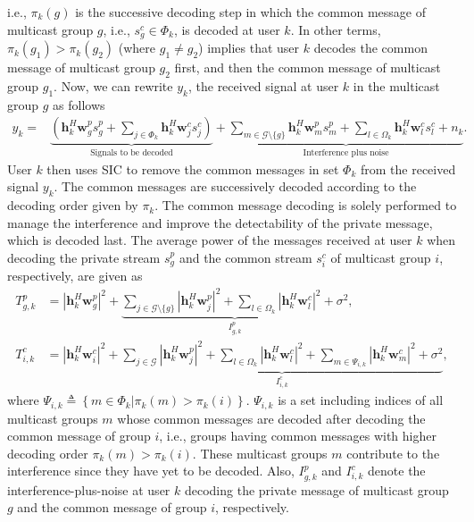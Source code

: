 \documentclass[12pt,draftcls,onecolumn]{IEEEtran}
\theoremstyle{remark}
\theoremstyle{definition}
\begin{document}
i.e., $\pi_{k}(g)$ is the successive decoding step in which the common message of multicast group $g$, i.e., $s_g^c \in \Phi_k$, is decoded at user $k$. {In other terms, $\pi_{k}(g_1) > \pi_{k}(g_2)$ (where $g_1 \neq g_2$) implies that user $k$ decodes the common message of multicast group $g_2$ first, and then the common message of multicast group $g_1$.
	Now, we can rewrite ${y}_k$, the received signal at user $k$ in the multicast group $g$ as follows
	\begin{align}\label{eq:e2.15}
	y_k = & \underbrace{\left(\mathbf{h}_{k}^H\mathbf{w}_{g}^p {s}_{g}^p + \sum_{j \in \Phi_{k}}\mathbf{h}_{k}^H\mathbf{w}_{j}^c {s}_{j}^c\right)}_{\text{Signals to be decoded}} + \underbrace{\sum_{m \in \mathcal{G}\setminus \{g\}}\mathbf{h}_{k}^H\mathbf{w}_{m}^p {s}_{m}^p + \sum_{l \in \Omega_{k}}\mathbf{h}_{k}^H\mathbf{w}_{l}^c {s}_{l}^c+ n_k}_\text{Interference plus noise}.
	\end{align}
	User $k$ then uses SIC to remove the common messages in set $\Phi_{k}$ from the received signal $y_k$. The common messages are successively decoded according to the decoding order given by $\pi_{k}$. The common message decoding is solely performed to manage the interference and improve the detectability of the private message, which is decoded last. The average power of the messages received at user $k$ when decoding the private stream $s_g^p$ and the common stream $s_i^c$ of multicast group $i$, respectively, are given as
	\begin{align}
	\label{eq:e2.16}
	T_{g,k}^p & = \left|\mathbf{h}_{k}^{H}\mathbf{w}_{g}^p \right|^2 +  \underbrace{\sum\limits_{j \in \mathcal{G}\setminus \{g\}}\left|\mathbf{h}_{k}^{H}\mathbf{w}_{j}^p \right|^2 + \sum\limits_{l \in \Omega_k}\left|\mathbf{h}_{k}^{H}\mathbf{w}_{l}^c \right|^2  + \sigma^2}_{I_{g,k}^p}, \\
	\label{eq:e2.17}
	T_{i, k}^c & = \left|\mathbf{h}_{k}^{H}\mathbf{w}_{i}^c \right|^2+\underbrace{\sum_{j \in \mathcal{G}}\left|\mathbf{h}_{k}^{H}\mathbf{w}_{j}^p \right|^2 + \sum\limits_{l \in \Omega_k}\left|\mathbf{h}_{k}^{H}\mathbf{w}_{l}^c \right|^2 + \sum\limits_{m  \in \Psi_{i, k}}\left|\mathbf{h}_{k}^{H}\mathbf{w}_{m}^c \right|^2 +\sigma^2}_{I_{i, k}^c},
	\end{align}
	where $\Psi_{i, k} \triangleq \left\lbrace m \in \Phi_k | \pi_{k}(m)> \pi_{k}(i) \right\rbrace$. $\Psi_{i, k}$ is a set including indices of all multicast groups $m$ whose common messages are decoded after decoding the common message of group $i$, i.e., groups having common messages with higher decoding order $\pi_{k}(m)>\pi_{k}(i)$. These multicast groups $m$ contribute to the interference since they have yet to be decoded. Also, $I_{g,k}^p$ and $I_{i,k}^c$ denote the interference-plus-noise at user $k$ decoding the private message of multicast group $g$ and the common message of group $i$, respectively.	
}
\end{document}
